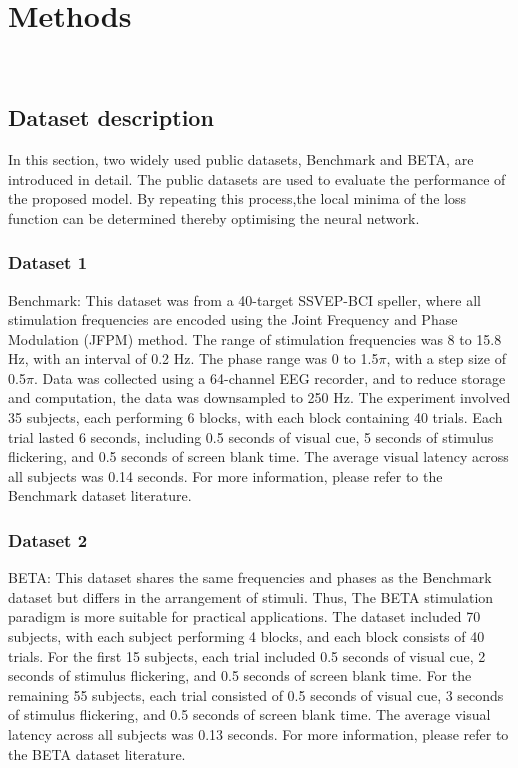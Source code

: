 \documentclass[10pt]{iopart}
\begin{document}
\section{Methods}
‌\subsection{Dataset description}
In this section, two widely used public datasets, Benchmark and BETA, are introduced in detail. The public datasets are used to evaluate the performance of the proposed model.
By repeating this process,the local minima of the loss function can be determined thereby optimising the neural network. 
‌\subsubsection{Dataset 1\\}
Benchmark: This dataset was from a 40-target SSVEP-BCI speller, where all stimulation frequencies are encoded using the Joint Frequency and Phase Modulation (JFPM) method. The range of stimulation frequencies was 8 to 15.8 Hz, with an interval of 0.2 Hz. The phase range was 0 to 1.5$\pi$, with a step size of 0.5$\pi$. Data was collected using a 64-channel EEG recorder, and to reduce storage and computation, the data was downsampled to 250 Hz. The experiment involved 35 subjects, each performing 6 blocks, with each block containing 40 trials. Each trial lasted 6 seconds, including 0.5 seconds of visual cue, 5 seconds of stimulus flickering, and 0.5 seconds of screen blank time. The average visual latency across all subjects was 0.14 seconds. For more information, please refer to the Benchmark dataset literature\cite{wang2016benchmark}.
‌\subsubsection{Dataset 2\\}
BETA: This dataset shares the same frequencies and phases as the Benchmark dataset but differs in the arrangement of stimuli. Thus, The BETA stimulation paradigm is more suitable for practical applications. The dataset included 70 subjects, with each subject performing 4 blocks, and each block consists of 40 trials. For the first 15 subjects, each trial included 0.5 seconds of visual cue, 2 seconds of stimulus flickering, and 0.5 seconds of screen blank time. For the remaining 55 subjects, each trial consisted of 0.5 seconds of visual cue, 3 seconds of stimulus flickering, and 0.5 seconds of screen blank time. The average visual latency across all subjects was 0.13 seconds. For more information, please refer to the BETA dataset literature\cite{liu2020beta}.
\end{document}
